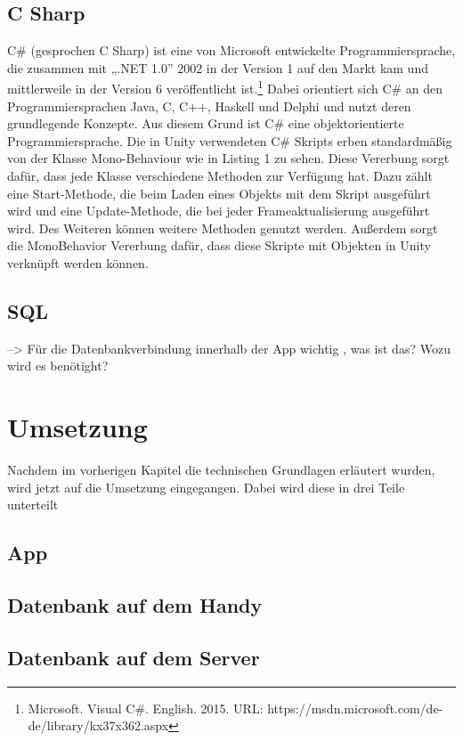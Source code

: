 \section{C Sharp}

C\# (gesprochen C Sharp) ist eine von Microsoft entwickelte Programmiersprache, die zusammen mit „.NET 1.0” 2002 in der Version 1 auf den Markt kam und mittlerweile in der Version 6 veröffentlicht ist.\footnote{Microsoft. Visual C#. English. 2015. URL: https://msdn.microsoft.com/de-de/library/kx37x362.aspx} Dabei orientiert sich C\# an den Programmiersprachen Java, C, C++, Haskell und Delphi und nutzt deren grundlegende Konzepte. Aus diesem Grund ist C\# eine objektorientierte Programmiersprache. Die in Unity verwendeten C\# Skripts erben standardmäßig von der Klasse Mono-Behaviour wie in Listing 1 zu sehen. Diese Vererbung sorgt dafür, dass jede Klasse verschiedene Methoden zur Verfügung hat. Dazu zählt eine Start-Methode, die beim Laden eines Objekts mit dem Skript ausgeführt wird und eine Update-Methode, die bei jeder Frameaktualisierung ausgeführt wird. Des Weiteren können weitere Methoden genutzt werden. Außerdem sorgt die MonoBehavior Vererbung dafür, dass diese Skripte mit Objekten in Unity verknüpft werden können.

\section{SQL}

	--> Für die Datenbankverbindung innerhalb der App wichtig , was ist das? Wozu wird es benötight?


\chapter{Umsetzung}

	Nachdem im vorherigen Kapitel die technischen Grundlagen erläutert wurden, wird jetzt auf die Umsetzung eingegangen. Dabei wird diese in drei Teile unterteilt

\section{App}
\section{Datenbank auf dem Handy}
\section{Datenbank auf dem Server}